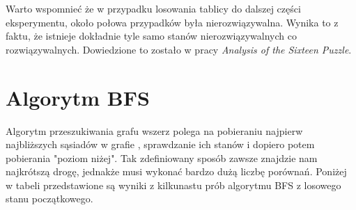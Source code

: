 \documentclass{classrep}
\begin{document}
Warto wspomnieć że w przypadku losowania tablicy do dalszej części eksperymentu, około połowa przypadków była nierozwiązywalna. Wynika to z faktu, że istnieje dokładnie tyle samo stanów nierozwiązywalnych co rozwiązywalnych. Dowiedzione to zostało w pracy \citep{sixteen}\textit{Analysis of the Sixteen Puzzle}.

\section{Algorytm BFS}
Algorytm przeszukiwania grafu wszerz polega na pobieraniu najpierw najbliższych sąsiadów w grafie , sprawdzanie ich stanów i dopiero potem pobierania "poziom niżej". Tak zdefiniowany sposób zawsze znajdzie nam najkrótszą drogę, jednakże musi wykonać bardzo dużą liczbę porównań. Poniżej w tabeli przedstawione są wyniki z kilkunastu prób algorytmu BFS z losowego stanu początkowego.
\end{document}
